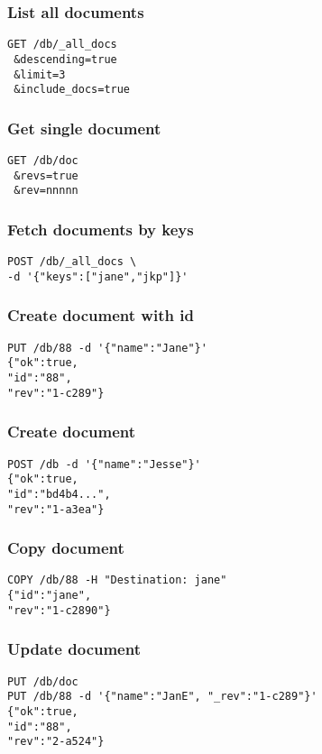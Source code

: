 \begin{multicols}{2}
  
\subsubsection{List all documents}
\begin{lstlisting}
GET /db/_all_docs
 &descending=true
 &limit=3
 &include_docs=true
\end{lstlisting}

\subsubsection{Get single document}
\begin{lstlisting}
GET /db/doc
 &revs=true
 &rev=nnnnn
\end{lstlisting}

\subsubsection{Fetch documents by keys}
\begin{lstlisting}
POST /db/_all_docs \
-d '{"keys":["jane","jkp"]}'
\end{lstlisting}

\subsubsection{Create document with id}
\begin{lstlisting}
PUT /db/88 -d '{"name":"Jane"}'
{"ok":true,
"id":"88",
"rev":"1-c289"}
\end{lstlisting}

\subsubsection{Create document}
\begin{lstlisting}
POST /db -d '{"name":"Jesse"}' 
{"ok":true,
"id":"bd4b4...",
"rev":"1-a3ea"}
\end{lstlisting}

\subsubsection{Copy document}
\begin{lstlisting}
COPY /db/88 -H "Destination: jane" 
{"id":"jane",
"rev":"1-c2890"}
\end{lstlisting}

\subsubsection{Update document}
\begin{lstlisting}
PUT /db/doc
PUT /db/88 -d '{"name":"JanE", "_rev":"1-c289"}'
{"ok":true,
"id":"88",
"rev":"2-a524"}
\end{lstlisting}


\end{multicols}
